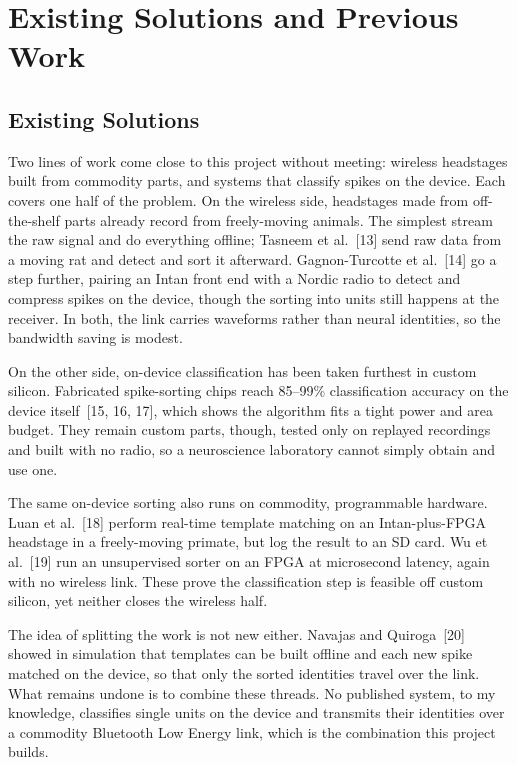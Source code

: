 \documentclass[11pt]{article}
\begin{document}
\section{Existing Solutions and Previous Work}

\subsection{Existing Solutions}
Two lines of work come close to this project without meeting: wireless headstages built
from commodity parts, and systems that classify spikes on the device. Each covers one half
of the problem. On the wireless side, headstages made from off-the-shelf parts already
record from freely-moving animals. The simplest stream the raw signal and do everything
offline; Tasneem et al.~[13] send raw data from a moving rat and detect and sort it
afterward. Gagnon-Turcotte et al.~[14] go a step further, pairing an Intan front end with a
Nordic radio to detect and compress spikes on the device, though the sorting into units
still happens at the receiver. In both, the link carries waveforms rather than neural
identities, so the bandwidth saving is modest.

On the other side, on-device classification has been taken furthest in custom silicon.
Fabricated spike-sorting chips reach 85--99\% classification accuracy on the device
itself~[15, 16, 17], which shows the algorithm fits a tight power and area budget. They
remain custom parts, though, tested only on replayed recordings and built with no radio, so
a neuroscience laboratory cannot simply obtain and use one.

The same on-device sorting also runs on commodity, programmable hardware. Luan et al.~[18]
perform real-time template matching on an Intan-plus-FPGA headstage in a freely-moving
primate, but log the result to an SD card. Wu et al.~[19] run an unsupervised sorter on an
FPGA at microsecond latency, again with no wireless link. These prove the classification
step is feasible off custom silicon, yet neither closes the wireless half.

The idea of splitting the work is not new either. Navajas and Quiroga~[20] showed in
simulation that templates can be built offline and each new spike matched on the device, so
that only the sorted identities travel over the link. What remains undone is to combine
these threads. No published system, to my knowledge, classifies single units on the device
and transmits their identities over a commodity Bluetooth Low Energy link, which is the
combination this project builds.
\end{document}
